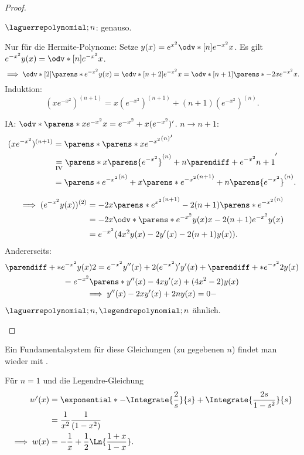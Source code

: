 \begin{proof}
\begin{proofdescription}
    \( \laguerrepolynomial;{n} \): genauso.
    \item[\ordinalnum{2} \Beh] Nur für die Hermite-Polynome: Setze \( y(x)=e^{x^2}\odv*[n]{e^{-x^2}}{x} \). Es gilt \( e^{-x^2}y(x)=\odv*[n]{e^{-x^2}}{x} \).
    \begin{equation*}
      \implies \odv*[2]{\parens*{e^{-x^2}y(x)}}=\odv*[n+2]{e^{-x^2}}{x}=\odv*[n+1]{\parens*{-2xe^{-x^2}}}{x}.
    \end{equation*}
    Induktion:
    \begin{equation*}
      (xe^{-x^2})^{(n+1)}=x(e^{-x^2})^{(n+1)}+(n+1)(e^{-x^2})^{(n)}.
    \end{equation*}
    \begin{subproof}
      IA\@: \( \odv*{\parens*{xe^{-x^2}}}{x}=e^{-x^2}+x(e^{-x^2})' \).
      \( n\to n+1 \):
      \begin{align*}
        (xe^{-x^2})^{(n+1)}&=\parens*{\parens*{xe^{-x^2}}^{(n)}}'\\
        &\underset{\text{IV}}{=}\parens*{x\parens{e^{-x^2}}^{(n)}+n\parendiff+{e^{-x^2}}{n+1}}'\\
        &=\parens*{e^{-x^2}}^{(n)}+x\parens*{e^{-x^2}}^{(n+1)}+n\parens{e^{-x^2}}^{(n)}.
      \end{align*}
    \end{subproof}
    \begin{align*}
      \implies (e^{-x^2}y(x))^{(2)}&=-2x\parens*{e^{x^2}}^{(n+1)}-2(n+1)\parens*{e^{-x^2}}^{(n)}\\
      &=-2x\odv*{\parens*{e^{-x^2}y(x)}}{x}-2(n+1)e^{-x^2}y(x)\\
      &=e^{-x^2}(4x^2y(x)-2y'(x)-2(n+1)y(x)).
    \end{align*}
    Andererseits:
    \begin{gather*}
      \parendiff+*{e^{-x^2}y(x)}{2}=e^{-x^2}y''(x)+2(e^{-x^2})'y'(x)+\parendiff+*{e^{-x^2}}{2}y(x)\\
      =e^{-x^2}\parens*{y''(x)-4xy'(x)+(4x^2-2)y(x)}\\
      \implies y''(x)-2xy'(x)+2ny(x)=0-
    \end{gather*}
    \( \laguerrepolynomial;{n},\legendrepolynomial;{n} \) ähnlich.
  \end{proofdescription}  
\end{proof}
Ein Fundamentalsystem für diese Gleichungen (zu gegebenen \( n \)) findet man \zb wieder mit .

\begin{beispiel*}
  Für \( n=1 \) und die Legendre-Gleichung
  \begin{align*}
    w'(x)&=\exponential*{-\Integrate{\frac{2}{s}}{s}+\Integrate{\frac{2s}{1-s^2}}{s}}\\
    &=\frac{1}{x^2}\frac{1}{(1-x^2)}\\
    \implies w(x)&=-\frac{1}{x}+\frac{1}{2}\Ln{\frac{1+x}{1-x}}.
  \end{align*}
\end{beispiel*}